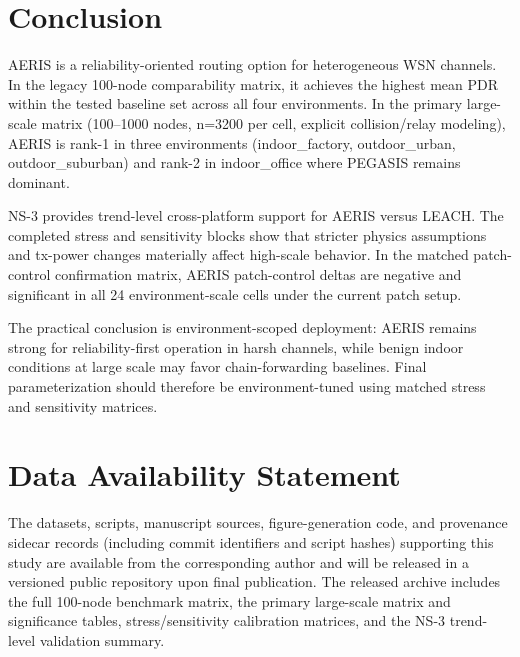 ﻿\documentclass[sensors,article,submit,moreauthors,pdftex]{Definitions/mdpi}
\begin{document}
\section{Conclusion}
AERIS is a reliability-oriented routing option for heterogeneous WSN channels. In the legacy 100-node comparability matrix, it achieves the highest mean PDR within the tested baseline set across all four environments. In the primary large-scale matrix (100--1000 nodes, n=3200 per cell, explicit collision/relay modeling), AERIS is rank-1 in three environments (indoor\_factory, outdoor\_urban, outdoor\_suburban) and rank-2 in indoor\_office where PEGASIS remains dominant.

NS-3 provides trend-level cross-platform support for AERIS versus LEACH. The completed stress and sensitivity blocks show that stricter physics assumptions and tx-power changes materially affect high-scale behavior. In the matched patch-control confirmation matrix, AERIS patch-control deltas are negative and significant in all 24 environment-scale cells under the current patch setup.

The practical conclusion is environment-scoped deployment: AERIS remains strong for reliability-first operation in harsh channels, while benign indoor conditions at large scale may favor chain-forwarding baselines. Final parameterization should therefore be environment-tuned using matched stress and sensitivity matrices.

\section*{Data Availability Statement}
The datasets, scripts, manuscript sources, figure-generation code, and provenance sidecar records (including commit identifiers and script hashes) supporting this study are available from the corresponding author and will be released in a versioned public repository upon final publication. The released archive includes the full 100-node benchmark matrix, the primary large-scale matrix and significance tables, stress/sensitivity calibration matrices, and the NS-3 trend-level validation summary.


\end{document}

